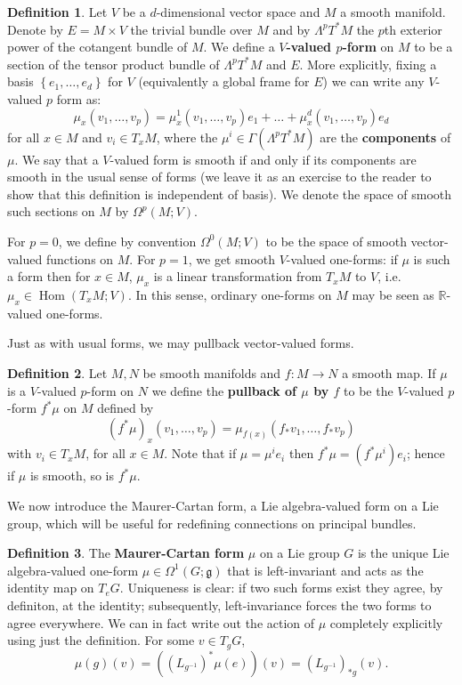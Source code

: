 \documentclass{book}
\newcommand{\R}{\mathbb{R}}
\newcommand{\fr}{\mathfrak}
\DeclareMathOperator{\Hom}{Hom}
\theoremstyle{plain}
\theoremstyle{definition}
\newtheorem{defn}{Definition}
\theoremstyle{remark}
\begin{document}
\begin{defn}
    Let $V$ be a $d$-dimensional vector space and $M$ a smooth manifold. Denote by $E=M\times V$ the trivial bundle over $M$ and by $\Lambda^pT^*M$ the
    $p$th exterior power of the cotangent bundle of $M$.
    We define a \textbf{$V$-valued $p$-form} on $M$ to be a section of the tensor product bundle of $\Lambda^pT^*M$ and $E$.
    More explicitly, fixing a basis $\left\{ e_1,\ldots,e_d \right\}$ for $V$ (equivalently a global frame for $E$) we can write any $V$-valued $p$ form as:
    \[\mu_x(v_1,\ldots,v_p)=\mu_x^1(v_1,\ldots,v_p)e_1+\ldots+\mu_x^d(v_1,\ldots,v_p)e_d\]
    for all $x\in M$ and $v_i\in T_xM$, where the $\mu^i\in\Gamma(\Lambda^pT^*M)$ are the \textbf{components} of $\mu$. We say that a $V$-valued
    form is smooth if and only if its components are smooth in the usual sense of forms (we leave it as an exercise to the reader to show
    that this definition is independent of basis).
    We denote the space of smooth such sections on $M$ by $\Omega^p(M;V).$

    For $p=0$, we define by convention $\Omega^0(M;V)$ to be the space of smooth vector-valued functions on $M$.
    For $p=1$, we get smooth $V$-valued one-forms: if $\mu$ is such a form then for $x\in M$, $\mu_x$
    is a linear transformation from $T_xM$ to $V$, i.e. $\mu_x\in\Hom(T_xM;V).$ In this sense, ordinary one-forms on $M$
    may be seen as $\R$-valued one-forms.
\end{defn}

Just as with usual forms, we may pullback vector-valued forms.
\begin{defn}
    Let $M,N$ be smooth manifolds and $f:M\to N$ a smooth map. If $\mu$ is a $V$-valued $p$-form on $N$ we define the \textbf{pullback of $\mu$ by $f$}
    to be the $V$-valued $p$-form $f^*\mu$ on $M$ defined by
    \[(f^*\mu)_x(v_1,\ldots,v_p)=\mu_{f(x)}(f_*v_1,\ldots,f_*v_p)\]
    with $v_i\in T_xM$, for all $x\in M$. Note that if $\mu=\mu^ie_i$ then $f^*\mu=(f^*\mu^i)e_i$; hence if $\mu$ is smooth, so is $f^*\mu$.
\end{defn}

We now introduce the Maurer-Cartan form, a Lie algebra-valued form on a Lie group, which will be useful for redefining connections on principal bundles.
\begin{defn}
    The \textbf{Maurer-Cartan form} $\mu$ on a Lie group $G$ is the unique Lie algebra-valued one-form $\mu \in \Omega^1(G; \fr g)$
    that is left-invariant and acts as the identity map on $T_eG$. Uniqueness is clear: if two such forms exist they agree, by definiton, at
    the identity; subsequently, left-invariance forces the two forms to agree everywhere. We can in fact write out the action of $\mu$
    completely explicitly using just the definition. For some $v\in T_gG$,
    \[\mu(g)(v)=\left( (L_{g^{-1}})^*\mu(e) \right)(v)=(L_{g^{-1}})_{*g}(v).\]
\end{defn}
\end{document}
